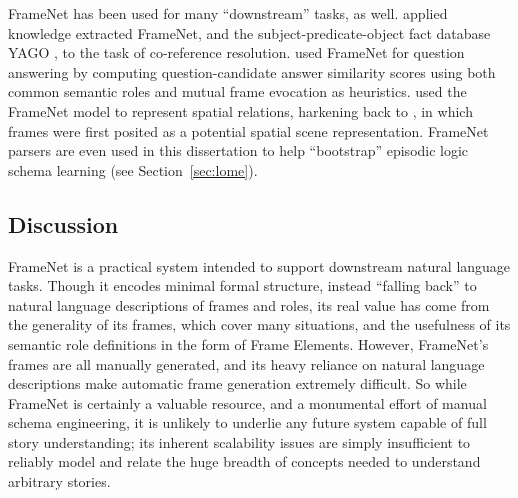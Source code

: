 FrameNet has been used for many ``downstream'' tasks, as well. \citet{rahman2011} applied knowledge extracted FrameNet, and the subject-predicate-object fact database YAGO \citep{yago}, to the task of co-reference resolution. \citet{shen2007using} used FrameNet for question answering by computing question-candidate answer similarity scores using both common semantic roles and mutual frame evocation as heuristics. \citet{framenetspatial} used the FrameNet model to represent spatial relations, harkening back to \citep{Minsky:1974:FRK:889222}, in which frames were first posited as a potential spatial scene representation. FrameNet parsers are even used in this dissertation to help ``bootstrap'' episodic logic schema learning (see Section~\ref{sec:lome}).

\subsection{Discussion}

FrameNet is a practical system intended to support downstream natural language tasks. Though it encodes minimal formal structure, instead ``falling back'' to natural language descriptions of frames and roles, its real value has come from the generality of its frames, which cover many situations, and the usefulness of its semantic role definitions in the form of Frame Elements. However, FrameNet's frames are all manually generated, and its heavy reliance on natural language descriptions make automatic frame generation extremely difficult. So while FrameNet is certainly a valuable resource, and a monumental effort of manual schema engineering, it is unlikely to underlie any future system capable of full story understanding; its inherent scalability issues are simply insufficient to reliably model and relate the huge breadth of concepts needed to understand arbitrary stories.

